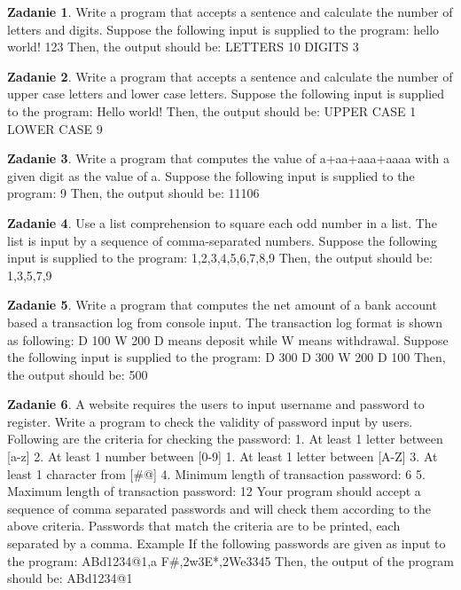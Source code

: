 \documentclass[11pt]{article}
\theoremstyle{definition}
\newtheorem{zadanie}{Zadanie}
\begin{document}
\begin{zadanie}
Write a program that accepts a sentence and calculate the number of letters and digits.
Suppose the following input is supplied to the program:
hello world! 123
Then, the output should be:
LETTERS 10
DIGITS 3
\end{zadanie}
\begin{zadanie}
	Write a program that accepts a sentence and calculate the number of upper case letters and lower case letters.
	Suppose the following input is supplied to the program:
	Hello world!
	Then, the output should be:
	UPPER CASE 1
	LOWER CASE 9

	
\end{zadanie}
\begin{zadanie}
	Write a program that computes the value of a+aa+aaa+aaaa with a given digit as the value of a.
	Suppose the following input is supplied to the program:
	9
	Then, the output should be:
	11106	
\end{zadanie}
\begin{zadanie}
	Use a list comprehension to square each odd number in a list. The list is input by a sequence of comma-separated numbers.
	Suppose the following input is supplied to the program:
	1,2,3,4,5,6,7,8,9
	Then, the output should be:
	1,3,5,7,9

	
\end{zadanie}
\begin{zadanie}
	Write a program that computes the net amount of a bank account based a transaction log from console input. The transaction log format is shown as following:
	D 100
	W 200
	D means deposit while W means withdrawal.
	Suppose the following input is supplied to the program:
	D 300
	D 300
	W 200
	D 100
	Then, the output should be:
	500

	
\end{zadanie}
\begin{zadanie}
	A website requires the users to input username and password to register. Write a program to check the validity of password input by users.
	Following are the criteria for checking the password:
	1. At least 1 letter between [a-z]
	2. At least 1 number between [0-9]
	1. At least 1 letter between [A-Z]
	3. At least 1 character from [\#@]
	4. Minimum length of transaction password: 6
	5. Maximum length of transaction password: 12
	Your program should accept a sequence of comma separated passwords and will check them according to the above criteria. Passwords that match the criteria are to be printed, each separated by a comma.
	Example
	If the following passwords are given as input to the program:
	ABd1234@1,a F\#,2w3E*,2We3345
	Then, the output of the program should be:
	ABd1234@1

	
\end{zadanie}
\end{document}
